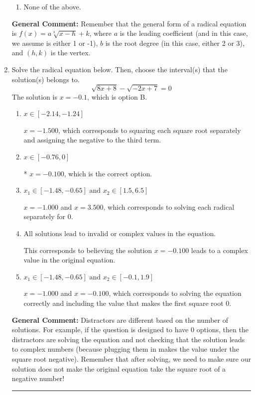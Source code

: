 \documentclass{extbook}[14pt]
\newcommand{\litem}[1]{\item #1

\rule{\textwidth}{0.4pt}}
\begin{document}
\begin{enumerate}
{\begin{enumerate}[label=\Alph*.]
\item None of the above.\end{enumerate}
\textbf{General Comment:} Remember that the general form of a radical equation is $ f(x) = a \sqrt[b]{x - h} + k $, where $a$ is the leading coefficient (and in this case, we assume is either 1 or -1), $b$ is the root degree (in this case, either 2 or 3), and $(h, k)$ is the vertex.
}
\litem{
Solve the radical equation below. Then, choose the interval(s) that the solution(s) belongs to.
\[ \sqrt{8 x + 8} - \sqrt{-2 x + 7} = 0 \]The solution is \( x = -0.1 \), which is option B.\begin{enumerate}[label=\Alph*.]
\item \( x \in [-2.14,-1.24] \)

$x = -1.500$, which corresponds to squaring each square root separately and assigning the negative to the third term.
\item \( x \in [-0.76,0] \)

* $x = -0.100$, which is the correct option.
\item \( x_1 \in [-1.48, -0.65] \text{ and } x_2 \in [1.5,6.5] \)

$x = -1.000$ and $x = 3.500$, which corresponds to solving each radical separately for 0.
\item \( \text{All solutions lead to invalid or complex values in the equation.} \)

This corresponds to believing the solution $x = -0.100$ leads to a complex value in the original equation.
\item \( x_1 \in [-1.48, -0.65] \text{ and } x_2 \in [-0.1,1.9] \)

$x = -1.000$ and $x = -0.100$, which corresponds to solving the equation correctly and including the value that makes the first square root 0.
\end{enumerate}

\textbf{General Comment:} Distractors are different based on the number of solutions. For example, if the question is designed to have 0 options, then the distractors are solving the equation and not checking that the solution leads to complex numbers (because plugging them in makes the value under the square root negative). Remember that after solving, we need to make sure our solution does not make the original equation take the square root of a negative number!
}
\end{enumerate}
\end{document}
